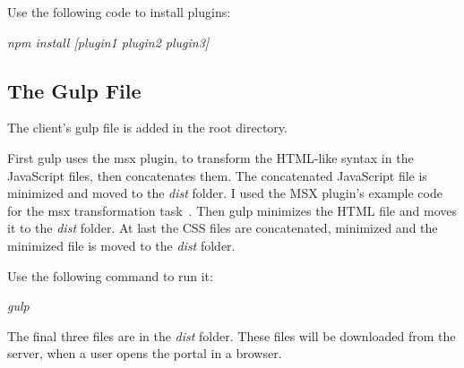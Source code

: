 Use the following code to install plugins:

\emph{npm install [plugin1 plugin2 plugin3]}

\subsection{The Gulp File}
The client's gulp file is added in the root directory. 

First gulp uses the msx plugin, to transform the HTML-like syntax in the JavaScript files, then concatenates them. The concatenated JavaScript file is minimized and moved to the \emph{dist} folder. I used the MSX plugin's example code for the msx transformation task~\cite{gulp-msx-example}. Then gulp minimizes the HTML file and moves it to the \emph{dist} folder. At last the CSS files are concatenated, minimized and the minimized file is moved to the \emph{dist} folder.

Use the following command to run it:

\emph{gulp}

The final three files are in the \emph{dist} folder. These files will be downloaded from the server, when a user opens the portal in a browser.
